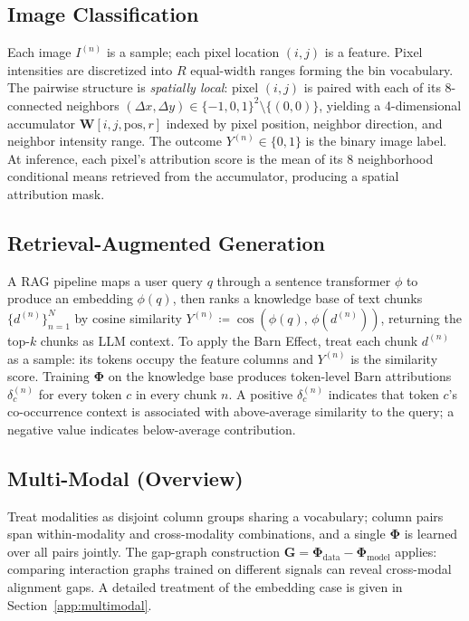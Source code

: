 \documentclass[11pt]{article}
\begin{document}
\subsection{Image Classification}

Each image $I^{(n)}$ is a sample; each pixel location $(i,j)$ is a feature.
Pixel intensities are discretized into $R$ equal-width ranges forming the bin vocabulary.
The pairwise structure is \emph{spatially local}: pixel $(i,j)$ is paired with each of its $8$-connected neighbors $(\Delta x, \Delta y) \in \{-1,0,1\}^2 \setminus \{(0,0)\}$, yielding a 4-dimensional accumulator $\bm{W}[i,j,\mathrm{pos},r]$ indexed by pixel position, neighbor direction, and neighbor intensity range.
The outcome $Y^{(n)} \in \{0,1\}$ is the binary image label.
At inference, each pixel's attribution score is the mean of its 8 neighborhood conditional means retrieved from the accumulator, producing a spatial attribution mask.

\subsection{Retrieval-Augmented Generation}

A RAG pipeline maps a user query $q$ through a sentence transformer $\phi$ to produce an embedding $\phi(q)$, then ranks a knowledge base of text chunks $\{d^{(n)}\}_{n=1}^{N}$ by cosine similarity $Y^{(n)} \coloneqq \cos(\phi(q),\,\phi(d^{(n)}))$, returning the top-$k$ chunks as LLM context.
To apply the Barn Effect, treat each chunk $d^{(n)}$ as a sample: its tokens occupy the feature columns and $Y^{(n)}$ is the similarity score.
Training $\bm{\Phi}$ on the knowledge base produces token-level Barn attributions $\delta_c^{(n)}$ for every token $c$ in every chunk $n$.
A positive $\delta_c^{(n)}$ indicates that token $c$'s co-occurrence context is associated with above-average similarity to the query; a negative value indicates below-average contribution.

\subsection{Multi-Modal (Overview)}

Treat modalities as disjoint column groups sharing a vocabulary; column pairs span within-modality and cross-modality combinations, and a single $\bm{\Phi}$ is learned over all pairs jointly.
The gap-graph construction $\bm{G} = \bm{\Phi}_{\mathrm{data}} - \bm{\Phi}_{\mathrm{model}}$ applies: comparing interaction graphs trained on different signals can reveal cross-modal alignment gaps.
A detailed treatment of the embedding case is given in Section~\ref{app:multimodal}.
\end{document}
